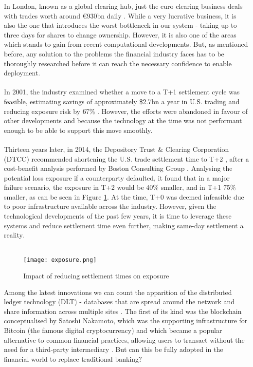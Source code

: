 \documentclass[12pt,twoside]{article}
\begin{document}
In London, known as a global clearing hub, just the euro clearing business deals with trades worth around \euro{930}bn daily \cite{euroclearing}. While a very lucrative business, it is also the one that introduces the worst bottleneck in our system - taking up to three days for shares to change ownership. However, it is also one of the areas which stands to gain from recent computational developments. But, as mentioned before, any solution to the problems the financial industry faces has to be thoroughly researched before it can reach the necessary confidence to enable deployment.
\\ \\
In 2001, the industry examined whether a move to a T+1 settlement cycle was feasible, estimating savings of approximately \$2.7bn a year in U.S. trading \cite{sia} and reducing exposure risk by 67\% \cite{oldletter}. However, the efforts were abandoned in favour of other developments and because the technology at the time was not performant enough to be able to support this move smoothly.
\\ \\
Thirteen years later, in 2014, the Depository Trust \& Clearing Corporation (DTCC) recommended shortening the U.S. trade settlement time to T+2 \cite{dtcc}, after a cost-benefit analysis performed by Boston Consulting Group \cite{bcg}. Analysing the potential loss exposure if a counterparty defaulted, it found that in a major failure scenario, the exposure in T+2 would be 40\% smaller, and in T+1 75\% smaller, as can be seen in Figure \ref{fig:exposure}. At the time, T+0 was deemed infeasible due to poor infrastructure available across the industry. However, given the technological developments of the past few years, it is time to leverage these systems and reduce settlement time even further, making same-day settlement a reality.
\\ \\
\begin{figure}[H]
\centering
\texttt{[image: exposure.png]}
\caption{Impact of reducing settlement times on exposure}
\centering
\label{fig:exposure}
\end{figure}

Among the latest innovations we can count the apparition of the distributed ledger technology (DLT) - databases that are spread around the network and share information across multiple sites \cite{pwc}. The first of its kind was the blockchain conceptualised by Satoshi Nakamoto, which was the supporting infrastructure for Bitcoin (the famous digital cryptocurrency) and which became a popular alternative to common financial practices, allowing users to transact without the need for a third-party intermediary \cite{blockchain}. But can this be fully adopted in the financial world to replace traditional banking?
\end{document}
